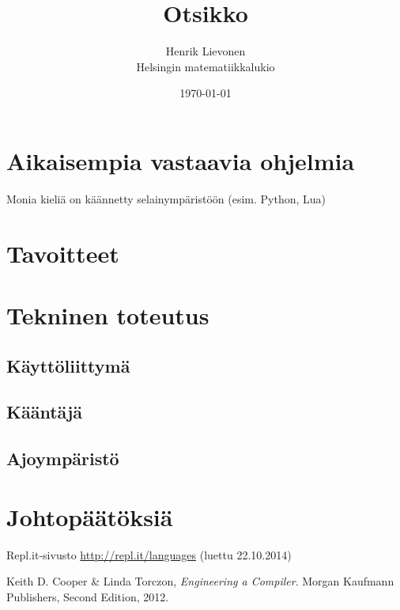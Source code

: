 \documentclass[12pt,a4paper]{article}
\title{Otsikko}
\date{\today}
\author{Henrik Lievonen \\ Helsingin matematiikkalukio}
\begin{document}
	\maketitle
	\thispagestyle{empty}

	\newpage
	\thispagestyle{empty}
	
	\newpage

	\tableofcontents
	\thispagestyle{empty}
	\newpage

	\setcounter{page}{1}
	
	
	
	
	
	\section{Aikaisempia vastaavia ohjelmia}
	Monia kieliä on käännetty selainympäristöön (esim. Python, Lua) \cite{repl.it}
	
	\section{Tavoitteet}
	\section{Tekninen toteutus}
	\subsection{Käyttöliittymä}
	\subsection{Kääntäjä}
	\subsection{Ajoympäristö}
	\section{Johtopäätöksiä}

	
	\begin{thebibliography}{9}
	
		Repl.it-sivusto \url{http://repl.it/languages} (luettu 22.10.2014)
	
		Keith D. Cooper \& Linda Torczon,
		\emph{Engineering a Compiler}.
		Morgan Kaufmann Publishers,
		Second Edition,
		2012.
	
	\end{thebibliography}
	
\end{document}

